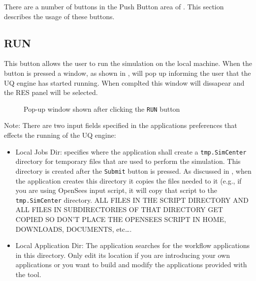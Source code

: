 There are a number of buttons in the Push Button area of . This section describes the usage of these buttons.

\subsection{RUN}

This button allows the user to run the simulation on the local machine. When the button is 
pressed a window, as shown in , will pop up informing the user 
that the UQ engine has started running. When complted this window will dissapear and the RES
panel will be selected.

\begin{figure}[!htbp]
  \caption{Pop-up window shown after clicking the \texttt{RUN} button}
  \label{fig:local_button}
\end{figure}

Note: There are two input fields specified in the applications preferences that effects the running of the UQ engine:

\begin{itemize}
\item Local Jobs Dir: specifies where the \texttt{\getsoftwarename{}} application shall
create a \texttt{tmp.SimCenter} directory for temporary files that are used to perform the simulation. This directory is created after the \texttt{Submit} button is pressed. As discussed in , when
the application creates this directory it copies the files needed to it (e.g., if you are using OpenSees input script, it
will copy that script to the \texttt{tmp.SimCenter} directory. ALL FILES IN
THE SCRIPT DIRECTORY AND ALL FILES IN SUBDIRECTORIES OF THAT DIRECTORY GET
COPIED SO DON’T PLACE THE OPENSEES SCRIPT IN HOME, DOWNLOADS, DOCUMENTS, etc….
\item Local Application Dir: The \texttt{\getsoftwarename{}} application searches for the workflow applications in this directory. Only edit its location if you are introducing your own applications or you want to build and modify the 
applications provided with the tool. 
\end{itemize}

